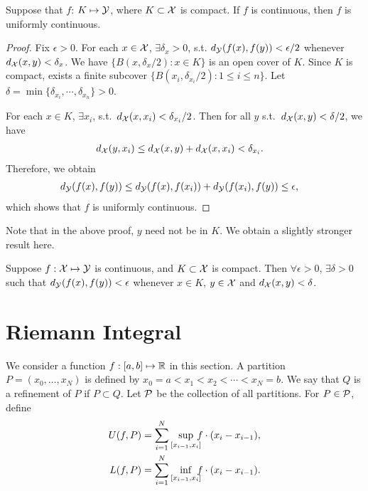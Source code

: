 \documentclass[12pt]{article}
\begin{document}
\begin{Lemma}
Suppose that $f$: $K \mapsto \mathcal{Y}$, where $K \subset \mathcal{X}$ is compact. If $f$ is continuous, then $f$ is uniformly continuous.
\end{Lemma}
\begin{proof}
Fix $\epsilon>0$. For each $x \in \mathcal{X}$, $\exists \delta_x>0$, s.t. $d_{\mathcal{Y}}(f(x),f(y))< \epsilon/2$ whenever $d_{\mathcal{X}}(x,y)<\delta_x$. We have $\{B(x,\delta_x/2) : x\in K\}$ is an open cover of $K$. Since $K$ is compact, exists a finite subcover $\{B(x_i,\delta_{x_i}/2): 1\leq i \leq n\}$. Let $\delta= \min\{\delta_{x_i},\cdots, \delta_{x_n}\}>0$. 

For each $x \in K$, $\exists x_i$, s.t.\ $d_{\mathcal{X}}(x,x_i)<\delta_{x_i}/2$. Then for all $y$ s.t.\ $d_{\mathcal{X}}(x,y)<\delta/2$, we have 
\begin{align*}
d_{\mathcal{X}}(y,x_i) &\leq d_{\mathcal{X}}(x,y)+d_{\mathcal{X}}(x,x_i)<\delta_{x_i}.
\end{align*}
Therefore, we obtain
\begin{align*}
d_{\mathcal{Y}}(f(x),f(y))&\leq d_{\mathcal{Y}}(f(x),f(x_i))+d_{\mathcal{Y}}(f(x_i),f(y)) \leq \epsilon,
\end{align*}
which shows that $f$ is uniformly continuous.
\end{proof}

Note that in the above proof, $y$ need not be in $K$. We obtain a slightly stronger result here.

\begin{Corollary}\label{wk2:f_K_compact}
Suppose $f:\mathcal{X}\mapsto\mathcal{Y}$ is continuous, and $K\subset\mathcal{X}$ is compact. Then $\forall \epsilon>0$, $\exists \delta>0$ such that $d_{\mathcal{Y}}(f(x),f(y))< \epsilon$ whenever $x \in K$, $y \in \mathcal{X}$ and  $d_{\mathcal{X}}(x,y)< \delta$.
\end{Corollary}

\section{Riemann Integral}

We consider a function $f:[a,b]\mapsto\mathbb{R}$ in this section. A partition $P=(x_0,\ldots,x_N)$ is defined by $x_0=a<x_1<x_2<\cdots<x_N=b$. We say that $Q$ is a refinement of $P$ if $P\subset Q$. Let $\mathcal{P}$ be the collection of all partitions. For $P\in\mathcal{P}$, define
\begin{align*}
U(f,P)&=\sum_{i=1}^N\sup_{[x_{i-1},x_i]}\mathllap{f}\cdot(x_i-x_{i-1}), \\
L(f,P)&=\sum_{i=1}^N\inf_{[x_{i-1},x_i]}\mathllap{f}\cdot(x_i-x_{i-1}). 
\end{align*}
\end{document}
